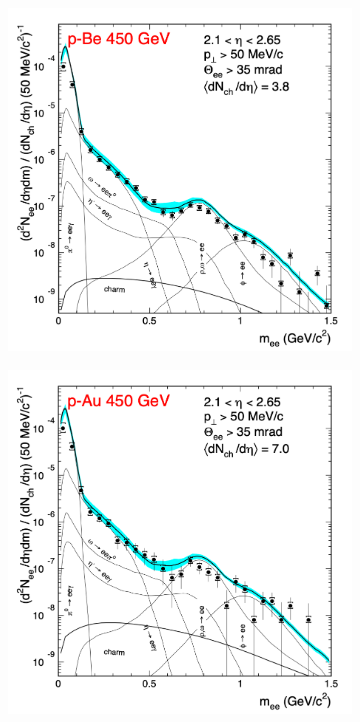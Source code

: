 \begin{figure}[htb]
    \centering
    \begin{subfigure}[b]{0.47\textwidth}
        \centering
        \includegraphics[width=\textwidth,clip]{figures/Chapter1/NA45pBe.png}
        \caption{}
        \label{fig:NA45pBe}
    \end{subfigure}
    \hfill
    \begin{subfigure}[b]{0.47\textwidth}
        \centering
        \includegraphics[width=\textwidth,clip]{figures/Chapter1/NA45pAu.png}

\end{subfigure}
\end{figure}
